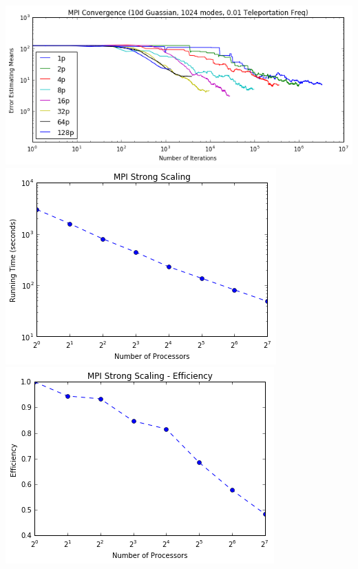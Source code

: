 \documentclass{article}
\begin{document}
\includegraphics[width=\textwidth]{mpi-conv.png}
\includegraphics[width=\textwidth]{mpi-strong-scale1.png}
\includegraphics[width=\textwidth]{mpi-strong-scale2.png}
\end{document}
